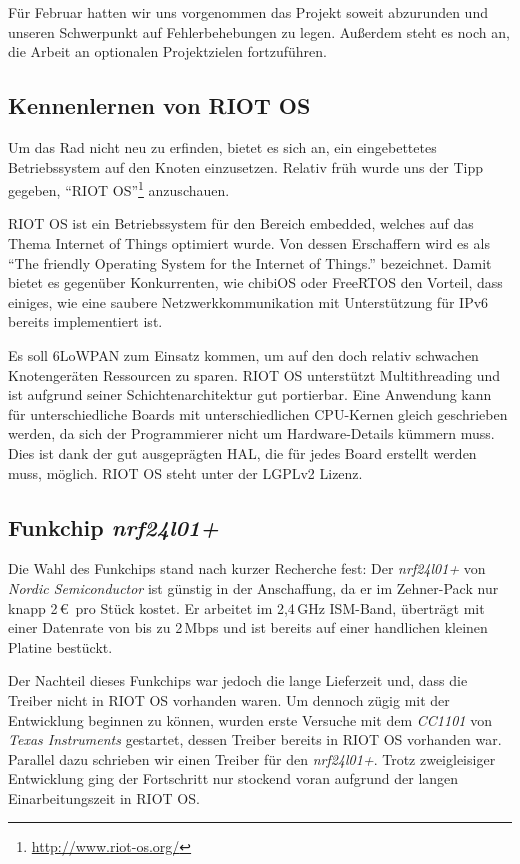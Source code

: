 \documentclass{IEEEtran}
\begin{document}
    Für Februar hatten wir uns vorgenommen das Projekt soweit abzurunden und 
    unseren Schwerpunkt auf Fehlerbehebungen zu legen. Außerdem steht es noch an, 
    die Arbeit an optionalen Projektzielen fortzuführen. 

    \subsection{Kennenlernen von RIOT OS}
    Um das Rad nicht neu zu erfinden, bietet es sich an, ein eingebettetes 
    Betriebssystem auf den Knoten einzusetzen. Relativ früh wurde uns der Tipp 
    gegeben, \enquote{RIOT OS}\footnote{\url{http://www.riot-os.org/}} anzuschauen.
    
    RIOT OS ist ein Betriebssystem für den Bereich embedded, welches auf das 
    Thema Internet of Things optimiert wurde.
    Von dessen Erschaffern wird es als \enquote{The friendly Operating System for the Internet of Things.} bezeichnet.
    Damit bietet es gegenüber Konkurrenten, wie chibiOS oder FreeRTOS den Vorteil, 
    dass einiges, wie eine saubere Netzwerkkommunikation mit Unterstützung für 
    IPv6 bereits implementiert ist. 
    
    Es soll \ac{6LoWPAN} zum Einsatz kommen, um auf den doch relativ schwachen 
    Knotengeräten Ressourcen zu sparen.
    RIOT OS unterstützt Multithreading und ist aufgrund seiner Schichtenarchitektur
    gut portierbar. Eine Anwendung kann für unterschiedliche Boards mit unterschiedlichen
    CPU-Kernen gleich geschrieben werden, da sich der Programmierer nicht um Hardware-Details
    kümmern muss. Dies ist dank der gut ausgeprägten \ac{HAL}, 
    die für jedes Board erstellt werden muss, möglich.
    RIOT OS steht unter der LGPLv2 Lizenz.

    \subsection{Funkchip \emph{nrf24l01+}}
    Die Wahl des Funkchips stand nach kurzer Recherche fest: Der \emph{nrf24l01+} von 
    \emph{Nordic Semiconductor} ist günstig in der Anschaffung, da er 
    im Zehner-Pack nur knapp 2\,\euro\ pro Stück kostet. Er arbeitet im 2,4\,GHz 
    ISM-Band, überträgt mit einer Datenrate von bis zu 2\,Mbps und ist bereits auf einer handlichen 
    kleinen Platine bestückt.
    
    Der Nachteil dieses Funkchips war jedoch die lange 
    Lieferzeit und, dass die Treiber nicht in RIOT OS vorhanden waren.
    Um dennoch zügig mit der Entwicklung beginnen zu können, wurden erste 
    Versuche mit dem \emph{CC1101} von \emph{Texas Instruments} gestartet, dessen Treiber 
    bereits in RIOT OS vorhanden war. Parallel dazu schrieben wir einen Treiber
    für den \emph{nrf24l01+}.
    Trotz zweigleisiger Entwicklung ging der 
    Fortschritt nur stockend voran aufgrund der langen Einarbeitungszeit in RIOT OS.
\end{document}
